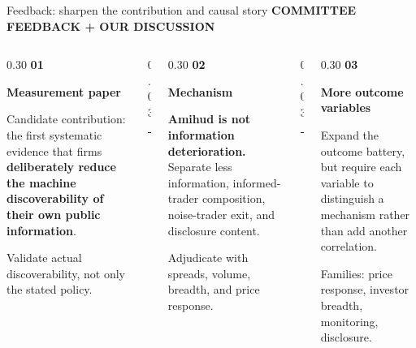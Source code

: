 \documentclass[aspectratio=169,10pt]{beamer}
\newcommand{\eyebrow}[1]{%
  {\color{accent}\fontsize{7.3}{9}\selectfont\bfseries\MakeUppercase{#1}}\par\vspace{0.10cm}%
}
\newcommand{\smallhead}[1]{%
  {\fontsize{11}{13}\selectfont\bfseries #1}\par\vspace{0.08cm}%
}
\newcommand{\bodytext}{\fontsize{9.4}{12.1}\selectfont}
\newcommand{\smalltext}{\fontsize{8.1}{10.2}\selectfont}
\begin{document}
\begin{frame}[t]{Feedback: sharpen the contribution and causal story}
\eyebrow{Committee feedback + our discussion}

\vspace{0.22cm}
\begin{columns}[T,onlytextwidth]
  \begin{column}{0.30\textwidth}
    {\color{accent}\fontsize{18}{20}\selectfont\bfseries 01}\par\vspace{0.13cm}
    \smallhead{Measurement paper}
    {\bodytext Candidate contribution: the first systematic evidence that firms \textbf{deliberately reduce the machine discoverability of their own public information}.}\par
    \vspace{0.06cm}
    {\smalltext\color{muted}Validate actual discoverability, not only the stated policy.}
  \end{column}
  \begin{column}{0.03\textwidth}\centering
    {\color{rule}\rule{0.55pt}{4.2cm}}
  \end{column}
  \begin{column}{0.30\textwidth}
    {\color{accent}\fontsize{18}{20}\selectfont\bfseries 02}\par\vspace{0.13cm}
    \smallhead{Mechanism}
    {\bodytext \textbf{Amihud is not information deterioration.} Separate less information, informed-trader composition, noise-trader exit, and disclosure content.}\par
    \vspace{0.06cm}
    {\smalltext\color{muted}Adjudicate with spreads, volume, breadth, and price response.}
  \end{column}
  \begin{column}{0.03\textwidth}\centering
    {\color{rule}\rule{0.55pt}{4.2cm}}
  \end{column}
  \begin{column}{0.30\textwidth}
    {\color{accent}\fontsize{18}{20}\selectfont\bfseries 03}\par\vspace{0.13cm}
    \smallhead{More outcome variables}
    {\bodytext Expand the outcome battery, but require each variable to distinguish a mechanism rather than add another correlation.}\par
    \vspace{0.06cm}
    {\smalltext\color{muted}Families: price response, investor breadth, monitoring, disclosure.}
  \end{column}
\end{columns}
\end{frame}
\end{document}

